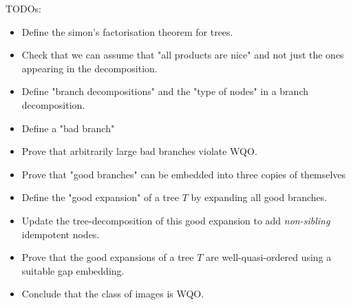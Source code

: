 TODOs:
\begin{itemize}
    \item Define the simon's factorisation theorem for trees.
    \item Check that we can assume that "all products are nice" and not just the ones
        appearing in the decomposition.
    \item Define "branch decompositions" and the "type of nodes" in a branch decomposition.
    \item Define a "bad branch"
    \item Prove that arbitrarily large bad branches violate WQO.
    \item Prove that "good branches" can be embedded into three copies of themselves
    \item Define the "good expansion" of a tree $T$ by expanding all good branches.
    \item Update the tree-decomposition of this good expansion to add \emph{non-sibling}
        idempotent nodes.
    \item Prove that the good expansions of a tree $T$ are well-quasi-ordered using a 
        suitable gap embedding.
    \item Conclude that the class of images is WQO.
\end{itemize}
